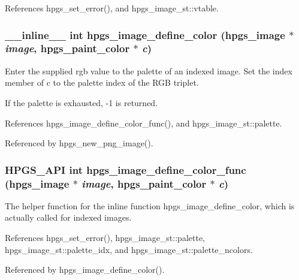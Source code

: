 References hpgs\_\-set\_\-error(), and hpgs\_\-image\_\-st::vtable.

\subsubsection[{hpgs\_\-image\_\-define\_\-color}]{\setlength{\rightskip}{0pt plus 5cm}\_\-\_\-inline\_\-\_\- int hpgs\_\-image\_\-define\_\-color ({\bf hpgs\_\-image} $\ast$ {\em image}, \/  {\bf hpgs\_\-paint\_\-color} $\ast$ {\em c})\hspace{0.3cm}{\ttfamily  [static]}}\label{group__image_ga2a4f19888f56d1b7fb65d6bba76fde9f}
Enter the supplied rgb value to the palette of an indexed image. Set the index member of {\ttfamily c} to the palette index of the RGB triplet.

If the palette is exhausted, -\/1 is returned. 

References hpgs\_\-image\_\-define\_\-color\_\-func(), and hpgs\_\-image\_\-st::palette.



Referenced by hpgs\_\-new\_\-png\_\-image().

\subsubsection[{hpgs\_\-image\_\-define\_\-color\_\-func}]{\setlength{\rightskip}{0pt plus 5cm}HPGS\_\-API int hpgs\_\-image\_\-define\_\-color\_\-func ({\bf hpgs\_\-image} $\ast$ {\em image}, \/  {\bf hpgs\_\-paint\_\-color} $\ast$ {\em c})}\label{group__image_ga7544e23df1fac79399161ceeb9ca77a3}
The helper function for the inline function {\ttfamily hpgs\_\-image\_\-define\_\-color}, which is actually called for indexed images. 

References hpgs\_\-set\_\-error(), hpgs\_\-image\_\-st::palette, hpgs\_\-image\_\-st::palette\_\-idx, and hpgs\_\-image\_\-st::palette\_\-ncolors.



Referenced by hpgs\_\-image\_\-define\_\-color().

